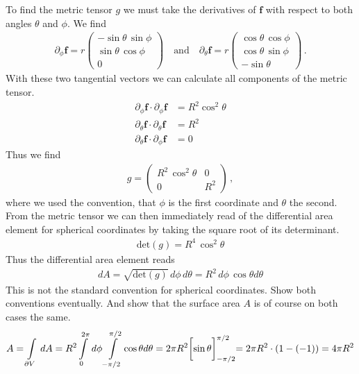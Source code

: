 \documentclass[11pt, DINA4, fleqn]{amsart}
\begin{document}
To find the metric tensor $g$ we must take the derivatives of $\boldsymbol{f}$ with respect to both angles $\theta$ and $\phi$.
We find
\begin{align}
\partial_{\phi}\boldsymbol{f} = r \begin{pmatrix}
-\sin\theta\, \sin\phi \\
\sin\theta\, \cos\phi \\
0
\end{pmatrix}
\quad \text{and} \quad
\partial_{\theta}\boldsymbol{f} = r \begin{pmatrix}
\cos\theta\, \cos\phi \\
\cos\theta\, \sin\phi \\
-\sin\theta
\end{pmatrix}
 \, .
\end{align}
With these two tangential vectors we can calculate all components of the metric tensor.
\begin{align}
\partial_{\phi}\boldsymbol{f} \cdot \partial_{\phi}\boldsymbol{f} &= 
R^2\cos^2\theta \\
\partial_{\theta}\boldsymbol{f} \cdot \partial_{\theta}\boldsymbol{f} &= 
R^2 \\
\partial_{\theta}\boldsymbol{f}\cdot \partial_{\phi}\boldsymbol{f} &= 0
\end{align}
Thus we find
\begin{align}
g = \begin{pmatrix}
R^2\, \cos^2\theta & 0 \\
0 & R^2
\end{pmatrix} \, ,
\end{align}
where we used the convention, that $\phi$ is the first coordinate and $\theta$ the second.
From the metric tensor we can then immediately read of the differential area element for spherical coordinates by taking the square root of its determinant.
\begin{align}
\text{det}(g) = R^4\, \cos^2\theta
\end{align}
Thus the differential area element reads
\begin{align}
dA = \sqrt{\text{det}(g)} \, d\phi\, d\theta= R^2 \, d\phi \, \cos\theta d\theta
\end{align}
This is not the standard convention for spherical coordinates.
Show both conventions eventually.
And show that the surface area $A$ is of course on both cases the same.
\begin{align}
A = \int\displaylimits_{\partial V} \, dA =  R^2 \int\displaylimits_{0}^{2\pi}\, d\phi \int \displaylimits_{-\pi/2}^{\pi/2} \cos\theta d\theta
= 2\pi R^2 \biggl[\sin\theta\biggl]_{-\pi/2}^{\pi/2} = 2\pi R^2 \cdot(1-(-1)) = 4\pi R^2
\end{align}
\end{document}
